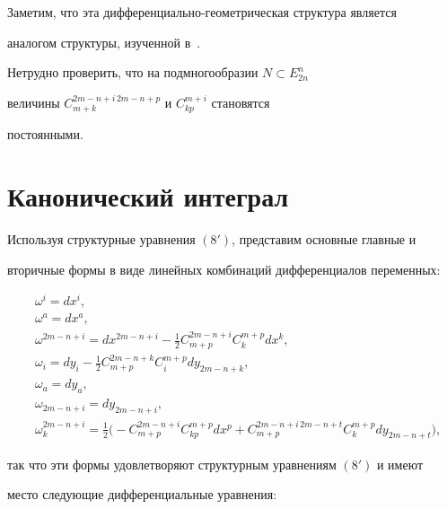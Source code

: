 Заметим, что эта дифференциально-геометрическая структура является


аналогом структуры, изученной в~\cite{ar7}.





Нетрудно проверить, что на подмногообразии $N\subset E^n_{2n}$


величины $C^{2m-n+i\, 2m-n+p}_{m+k}$ и $C^{m+i}_{kp}$ становятся


постоянными.








\section{Канонический интеграл}





Используя структурные уравнения $(8')$, представим основные главные и


вторичные формы в виде линейных комбинаций дифференциалов переменных:


\begin{align*}


&\omega^i=dx^i,\\


&\omega^a=dx^a,\\


&{\omega^{2m-n+i}=dx^{2m-n+i}-\frac{1}{2}C^{2m-


n+i}_{m+p}C^{m+p}_k dx^k},\\


&{\omega_i=dy_i -\frac{1}{2}C^{2m-n+k}_{m+p} C^{m+p}_i dy_{2m-n+k}},\\


&\omega_a=dy_a,\\


&\omega_{2m-n+i}=dy_{2m-n+i},\\


&{\omega^{2m-n+i}_k=\frac{1}{2}\big(-C^{2m-


n+i}_{m+p}C^{m+p}_{kp} dx^p+C^{2m-n+i\, 2m-n+t}_{m+p}C^{m+p}_k dy_{2m-


n+t}\big)},


\end{align*}


так что эти формы удовлетворяют структурным уравнениям $(8')$ и имеют 


место следующие дифференциальные уравнения:


